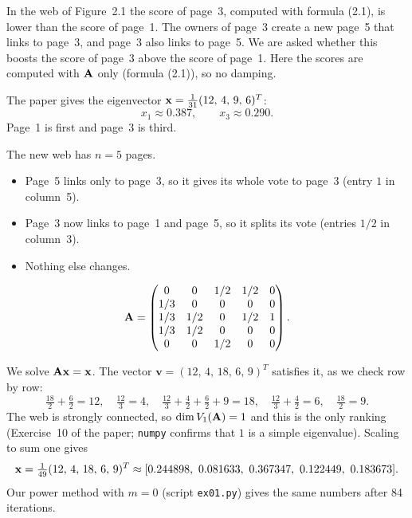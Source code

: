 

In the web of Figure~2.1 the score of page~3, computed with formula (2.1), is lower than the score of page~1.
The owners of page~3 create a new page~5 that links to page~3, and page~3 also links to page~5.
We are asked whether this boosts the score of page~3 above the score of page~1.
Here the scores are computed with $\mathbf{A}$ only (formula (2.1)), so no damping.


The paper gives the eigenvector $\mathbf{x} = \frac{1}{31}(12,\,4,\,9,\,6)^T$:
\[
  x_1 \approx 0.387, \qquad x_3 \approx 0.290 .
\]
Page~1 is first and page~3 is third.


The new web has $n = 5$ pages.
\begin{itemize}
  \item Page~5 links only to page~3, so it gives its whole vote to page~3 (entry $1$ in column~5).
  \item Page~3 now links to page~1 and page~5, so it splits its vote (entries $1/2$ in column~3).
  \item Nothing else changes.
\end{itemize}
\[
  \mathbf{A} = \begin{pmatrix}
    0 & 0 & 1/2 & 1/2 & 0\\
    1/3 & 0 & 0 & 0 & 0\\
    1/3 & 1/2 & 0 & 1/2 & 1\\
    1/3 & 1/2 & 0 & 0 & 0\\
    0 & 0 & 1/2 & 0 & 0
  \end{pmatrix}.
\]


We solve $\mathbf{A}\mathbf{x} = \mathbf{x}$.
The vector $\mathbf{v} = (12,\,4,\,18,\,6,\,9)^T$ satisfies it, as we check row by row:
\[
  \tfrac{18}{2}+\tfrac{6}{2} = 12,\quad
  \tfrac{12}{3} = 4,\quad
  \tfrac{12}{3}+\tfrac{4}{2}+\tfrac{6}{2}+9 = 18,\quad
  \tfrac{12}{3}+\tfrac{4}{2} = 6,\quad
  \tfrac{18}{2} = 9 .
\]
The web is strongly connected, so $\dim V_1(\mathbf{A}) = 1$ and this is the only ranking (Exercise~10 of the paper; \texttt{numpy} confirms that $1$ is a simple eigenvalue).
Scaling to sum one gives
\[
  \mathbf{x} = \tfrac{1}{49}(12,\,4,\,18,\,6,\,9)^T \approx [0.244898,\ 0.081633,\ 0.367347,\ 0.122449,\ 0.183673].
\]
Our power method with $m = 0$ (script \texttt{ex01.py}) gives the same numbers after 84 iterations.

